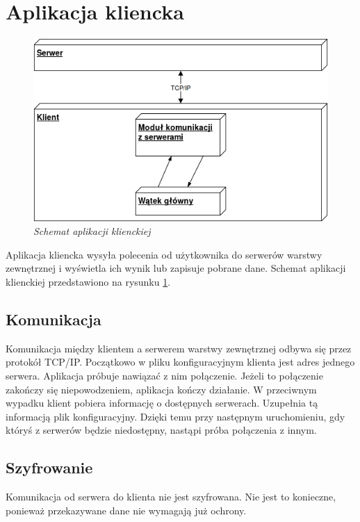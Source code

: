 \section{Aplikacja kliencka}

\begin{figure}[!h]
    \begin{center}
    \includegraphics[angle=0,scale=0.5]{img/client.png}
    \end{center}
    \caption{\em Schemat aplikacji klienckiej}
    \label{fig:client}
\end{figure}

Aplikacja kliencka wysyła polecenia od użytkownika do serwerów warstwy zewnętrznej i wyświetla ich wynik lub zapisuje pobrane dane. Schemat aplikacji klienckiej przedstawiono na rysunku \ref{fig:client}.

\subsection{Komunikacja}
Komunikacja między klientem a serwerem warstwy zewnętrznej odbywa się przez protokół TCP/IP. Początkowo w pliku konfiguracyjnym klienta jest adres jednego serwera. Aplikacja próbuje nawiązać z nim połączenie. Jeżeli to połączenie zakończy się niepowodzeniem, aplikacja kończy działanie. W przeciwnym wypadku klient pobiera informację o dostępnych serwerach. Uzupełnia tą informacją plik konfiguracyjny. Dzięki temu przy następnym uruchomieniu, gdy któryś z serwerów będzie niedostępny, nastąpi próba połączenia z innym.

\subsection{Szyfrowanie}
Komunikacja od serwera do klienta nie jest szyfrowana. Nie jest to konieczne, ponieważ przekazywane dane nie wymagają już ochrony.

